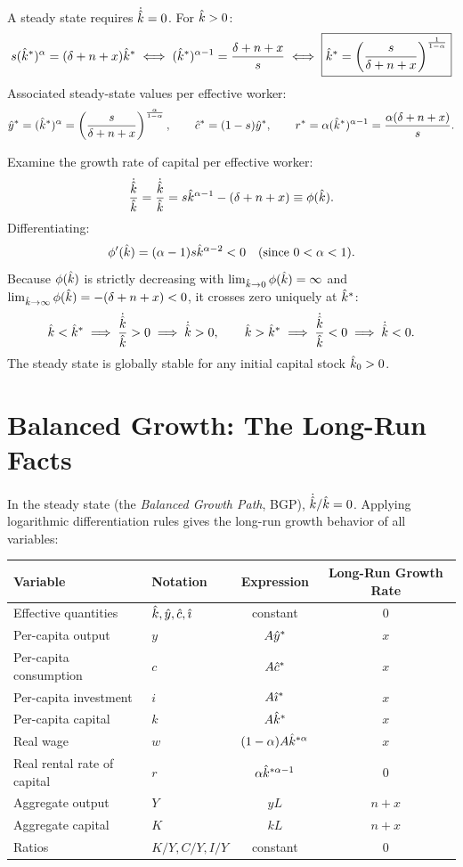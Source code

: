 \documentclass[11pt]{article}
\begin{document}
A steady state requires $\dot{\hat{k}} = 0$. For $\hat{k} > 0$:
\[
s(\hat{k}^*)^\alpha = (\delta+n+x)\hat{k}^* \iff (\hat{k}^*)^{\alpha-1} = \frac{\delta+n+x}{s} \iff \boxed{\hat{k}^* = \left(\frac{s}{\delta+n+x}\right)^{\frac{1}{1-\alpha}}}
\]
Associated steady-state values per effective worker:
\[
\hat{y}^* = (\hat{k}^*)^\alpha = \left(\frac{s}{\delta+n+x}\right)^{\frac{\alpha}{1-\alpha}}, \qquad \hat{c}^* = (1-s)\hat{y}^*, \qquad r^* = \alpha(\hat{k}^*)^{\alpha-1} = \frac{\alpha(\delta+n+x)}{s}.
\]

Examine the growth rate of capital per effective worker:
\[
\frac{\dot{\hat{k}}}{\hat{k}} = \frac{\dot{\hat{k}}}{\hat{k}} = s\hat{k}^{\alpha-1} - (\delta+n+x) \equiv \phi(\hat{k}).
\]
Differentiating:
\[
\phi'(\hat{k}) = (\alpha-1)s\hat{k}^{\alpha-2} < 0 \quad (\text{since } 0 < \alpha < 1).
\]
Because $\phi(\hat{k})$ is strictly decreasing with $\lim_{\hat{k} \to 0}\phi(\hat{k}) = \infty$ and $\lim_{\hat{k} \to \infty}\phi(\hat{k}) = -(\delta+n+x) < 0$, it crosses zero uniquely at $\hat{k}^*$:
\[
\hat{k} < \hat{k}^* \implies \frac{\dot{\hat{k}}}{\hat{k}} > 0 \implies \dot{\hat{k}} > 0, \qquad \hat{k} > \hat{k}^* \implies \frac{\dot{\hat{k}}}{\hat{k}} < 0 \implies \dot{\hat{k}} < 0.
\]
The steady state is globally stable for any initial capital stock $\hat{k}_0 > 0$.

\section{Balanced Growth: The Long-Run Facts}

In the steady state (the \emph{Balanced Growth Path}, BGP), $\dot{\hat{k}} / \hat{k} = 0$. Applying logarithmic differentiation rules gives the long-run growth behavior of all variables:

\begin{center}
\begin{tabular}{@{}llcc@{}}
\toprule
Variable & Notation & Expression & Long-Run Growth Rate \\
\midrule
Effective quantities & $\hat{k}, \hat{y}, \hat{c}, \hat{\imath}$ & constant & $0$ \\
Per-capita output & $y$ & $A\hat{y}^*$ & $x$ \\
Per-capita consumption & $c$ & $A\hat{c}^*$ & $x$ \\
Per-capita investment & $i$ & $A\hat{\imath}^*$ & $x$ \\
Per-capita capital & $k$ & $A\hat{k}^*$ & $x$ \\
Real wage & $w$ & $(1-\alpha)A\hat{k}^{*\alpha}$ & $x$ \\
Real rental rate of capital & $r$ & $\alpha\hat{k}^{*\alpha-1}$ & $0$ \\
Aggregate output & $Y$ & $y L$ & $n + x$ \\
Aggregate capital & $K$ & $k L$ & $n + x$ \\
Ratios & $K/Y, C/Y, I/Y$ & constant & $0$ \\
\bottomrule
\end{tabular}
\end{center}
\end{document}
